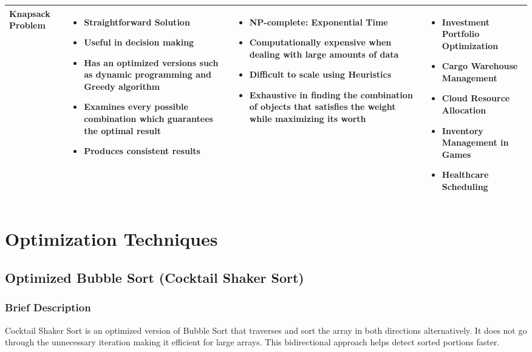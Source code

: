 \documentclass{article}
\begin{document}
\begin{longtable}{|p{2.5cm}|p{4.3cm}|p{4.3cm}|p{}|}
Knapsack Problem &
\begin{itemize}
\itemindent=-13pt
\item Straightforward Solution 
\item Useful in decision making
\item Has an optimized versions such as dynamic programming and Greedy algorithm
\item Examines every possible combination which guarantees the optimal result
\item Produces consistent results
\end{itemize}
&
\begin{itemize}
\itemindent=-13pt
\item NP-complete: Exponential Time
\item Computationally expensive when dealing with large amounts of data
\item Difficult to scale using Heuristics
\item Exhaustive in finding the combination of objects that satisfies the weight while maximizing its worth
\end{itemize}
&
\begin{itemize}
\itemindent=-13pt
\item Investment Portfolio Optimization
\item Cargo Warehouse Management
\item Cloud Resource Allocation
\item Inventory Management in Games
\item Healthcare Scheduling 
\end{itemize}
\\ 
\hline

\end{longtable}


\clearpage
\section{Optimization Techniques}
\subsection{Optimized Bubble Sort (Cocktail Shaker Sort)}
\subsubsection*{Brief Description}
Cocktail Shaker Sort is an optimized version of Bubble Sort that traverses and sort the array in both directions alternatively. It does not go through the unnecessary iteration making it efficient for large arrays. This bidirectional approach helps detect sorted portions faster.
\end{document}
